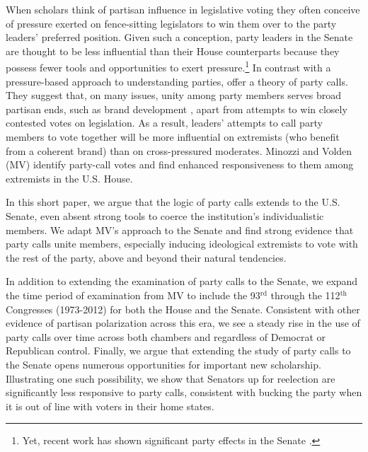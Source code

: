 \documentclass[12pt]{article}
\begin{document}


\noindent When scholars think of partisan influence in legislative voting they often conceive of pressure exerted on fence-sitting legislators to win them over to the party leaders' preferred position.  Given such a conception, party leaders in the Senate are thought to be less influential than their House counterparts because they possess fewer tools and opportunities to exert pressure.\footnote{\doublespacing\normalsize Yet, recent work has shown significant party effects in the Senate \citep[e.g.,][]{Gailmard:2007, Monroe:2008, Patty:2008, Volden:2006}.}  In contrast with a pressure-based approach to understanding parties, \cite{Minozzi:2013} offer a theory of party calls.  They suggest that, on many issues, unity among party members serves broad partisan ends, such as brand development \citep[e.g.,][]{Snyder:2002}, apart from attempts to win closely contested votes on legislation.  As a result, leaders' attempts to call party members to vote together will be more influential on extremists (who benefit from a coherent brand) than on cross-pressured moderates.  Minozzi and Volden (MV) identify party-call votes and find enhanced responsiveness to them among extremists in the U.S. House.

In this short paper, we argue that the logic of party calls extends to the U.S. Senate, even absent strong tools to coerce the institution's individualistic members.  We adapt MV's approach to the Senate and find strong evidence that party calls unite members, especially inducing ideological extremists to vote with the rest of the party, above and beyond their natural tendencies.

In addition to extending the examination of party calls to the Senate, we expand the time period of examination from MV to include the 93$^{\text{rd}}$ through the 112$^{\text{th}}$ Congresses (1973-2012) for both the House and the Senate. Consistent with other evidence of partisan polarization across this era, we see a steady rise in the use of party calls over time across both chambers and regardless of Democrat or Republican control. Finally, we argue that extending the study of party calls to the Senate opens numerous opportunities for important new scholarship.  Illustrating one such possibility, we show that Senators up for reelection are significantly less responsive to party calls, consistent with bucking the party when it is out of line with voters in their home states.
\end{document}
